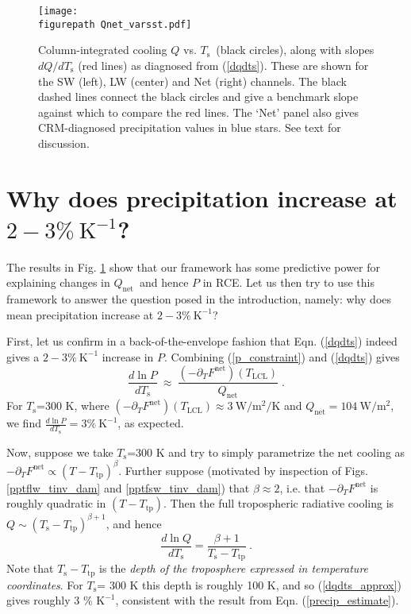 \documentclass[10pt]{article}
\newcommand{\beqn}{\begin{equation}}
\newcommand{\eeqn}{\end{equation}}
\newcommand{\eqnref}[1]{(\ref{#1})}
\newcommand{\ppt}{\ensuremath{\partial_T}}
\newcommand{\Qnet}{\ensuremath{Q_\mathrm{net}}}
\newcommand{\Fnet}{\ensuremath{F^\mathrm{net}}}
\newcommand{\Wmsq}{\ensuremath{\mathrm{W/m^2}}}
\newcommand{\Ts}{\ensuremath{T_\mathrm{s}}}
\newcommand{\Tlcl}{\ensuremath{T_\mathrm{LCL}}}
\newcommand{\Ttp}{\ensuremath{T_\mathrm{tp}}}
\newcommand{\Kinverse}{\ensuremath{\mathrm{K^{-1}}}}
\newcommand{\figurepath}{../figures/}
\begin{document}
\begin{figure}[t]
	\begin{center}
			\texttt{[image: \\figurepath Qnet\_varsst.pdf]}
		\caption{Column-integrated cooling $Q$ vs. \Ts\ (black circles), along with slopes $d Q/d \Ts$ (red lines) as diagnosed from \eqnref{dqdts}. These are shown for the SW (left), LW (center) and Net (right) channels.  The black dashed lines connect the black circles and give a benchmark slope against which to compare the red lines. The `Net' panel also gives CRM-diagnosed precipitation values in blue stars. See text for discussion.
		\label{Qnet_varsst}
		}
	\end{center}
\end{figure}



\section{Why does precipitation increase at $2 -3\%\ \Kinverse$?} \label{sec_1percent}
The results in Fig. \ref{Qnet_varsst} show that our framework  has some predictive power for explaining changes in \Qnet\ and hence $P$ in RCE. Let us then try to use this framework to answer the question posed in the introduction, namely: why does mean precipitation increase at $2 -3\%\ \Kinverse$?

First, let us confirm in a back-of-the-envelope fashion that Eqn. \eqnref{dqdts} indeed gives a $2 -3\%\ \Kinverse$ increase in $P$. Combining \eqnref{p_constraint} and \eqnref{dqdts} gives
	\beqn
		\frac{d \ln  P}{d \Ts} \ \approx\  \frac{(-\ppt \Fnet)(\Tlcl)}{\Qnet} \; .
	\label{precip_estimate}
	\eeqn
For \Ts=300 K, where $(-\ppt \Fnet)(\Tlcl) \approx 3 \ \Wmsq/\mathrm{K}$ and $\Qnet =  104\ \Wmsq$, we find $\frac{d \ln  P}{d \Ts}=  3\%\ \Kinverse$, as expected.

Now, suppose we take \Ts=300 K and  try to simply parametrize the net cooling as $-\ppt \Fnet \propto (T-\Ttp)^\beta$.  Further suppose (motivated by inspection of Figs. \ref{pptflw_tinv_dam} and \ref{pptfsw_tinv_dam})  that $\beta \approx 2$, i.e. that $-\ppt \Fnet$ is roughly quadratic  in $(T-\Ttp)$. Then the full tropospheric radiative cooling is $Q\sim (\Ts-\Ttp)^{\beta+1}$, and hence 
	\beqn
		\frac{d \ln Q}{d \Ts}  =  \frac{\beta+1}{\Ts-\Ttp}\ . \label{dqdts_approx}
	\eeqn
Note that $\Ts-\Ttp$ is the \emph{depth of the troposphere expressed in temperature coordinates}. For  \Ts= 300 K this depth is roughly 100 K, and so \eqnref{dqdts_approx} gives roughly 3 \% \Kinverse, consistent with the result from Eqn. \eqnref{precip_estimate}.
\end{document}
